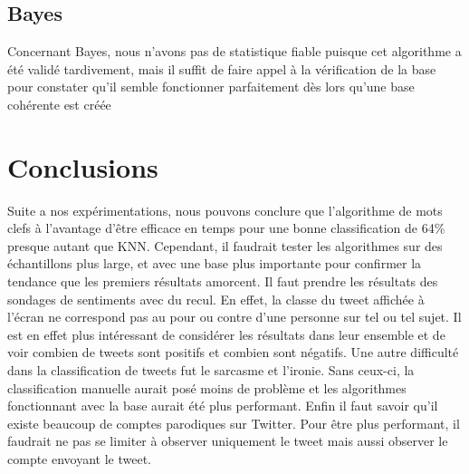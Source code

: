 \documentclass[a4paper,10pt]{report}
\begin{document}
    \section{Bayes}
      Concernant Bayes, nous n'avons pas de statistique fiable puisque cet algorithme a été validé tardivement,
      mais il suffit de faire appel à la vérification de la base pour constater qu'il semble fonctionner parfaitement dès lors qu'une base cohérente est créée
    
    
\chapter{Conclusions}
Suite a nos expérimentations, nous pouvons conclure que l'algorithme de mots clefs à l'avantage d'être efficace en temps pour une bonne classification de 64\%
presque autant que KNN.
\newline\newline
Cependant, il faudrait tester les algorithmes sur des échantillons plus large, et avec une base plus importante pour confirmer la tendance que les premiers résultats amorcent.
\newline\newline
Il faut prendre les résultats des sondages de sentiments avec du recul. En effet, la classe du tweet affichée à
l'écran ne correspond pas au pour ou contre d'une personne sur tel ou tel sujet. Il est en effet plus intéressant de considérer les résultats dans leur ensemble et de voir combien de tweets sont positifs et combien sont négatifs.
\newline\newline
Une autre difficulté dans la classification de tweets fut le sarcasme et l'ironie. Sans ceux-ci, la classification manuelle aurait posé moins de problème et les algorithmes fonctionnant avec la base aurait été plus performant.
\newline\newline
Enfin il faut savoir qu'il existe beaucoup de comptes parodiques sur Twitter. Pour être plus performant,
il faudrait ne pas se limiter à observer uniquement le tweet mais aussi observer le compte envoyant le tweet.
\end{document}
